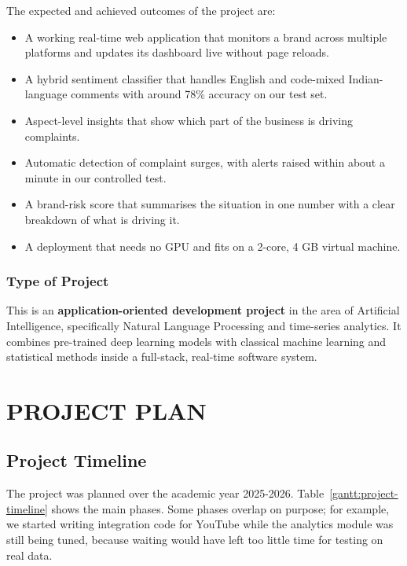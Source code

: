 \documentclass[12pt,a4paper]{report}
\begin{document}
The expected and achieved outcomes of the project are:
\begin{itemize}
    \item A working real-time web application that monitors a brand across multiple platforms and updates its dashboard live without page reloads.
    \item A hybrid sentiment classifier that handles English and code-mixed Indian-language comments with around 78\% accuracy on our test set.
    \item Aspect-level insights that show which part of the business is driving complaints.
    \item Automatic detection of complaint surges, with alerts raised within about a minute in our controlled test.
    \item A brand-risk score that summarises the situation in one number with a clear breakdown of what is driving it.
    \item A deployment that needs no GPU and fits on a 2-core, 4 GB virtual machine.
\end{itemize}

\subsection{Type of Project}

This is an \textbf{application-oriented development project} in the area of Artificial Intelligence, specifically Natural Language Processing and time-series analytics. It combines pre-trained deep learning models with classical machine learning and statistical methods inside a full-stack, real-time software system.

\chapter{PROJECT PLAN}

\section{Project Timeline}

The project was planned over the academic year 2025-2026. Table~\ref{gantt:project-timeline} shows the main phases. Some phases overlap on purpose; for example, we started writing integration code for YouTube while the analytics module was still being tuned, because waiting would have left too little time for testing on real data.
\end{document}
